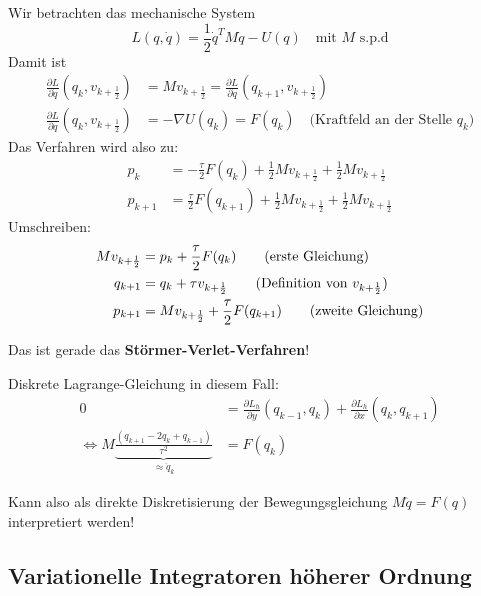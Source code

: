 Wir betrachten das mechanische System
\begin{equation*}
	L (q, \dot{q}) = \frac{1}{2} \dot{q}^T M \dot{q} - U(q) \quad\text{mit $M$ s.p.d}
\end{equation*}
Damit ist
\begin{align*}
	\frac{\partial L}{\partial \dot{q}}(q_k, v_{k + \frac{1}{2}}) & = Mv_{k + \frac{1}{2}} = \frac{\partial L}{\partial \dot{q}} (q_{k+1}, v_{k + \frac{1}{2}}) \\
	\frac{\partial L}{\partial q}(q_k, v_{k + \frac{1}{2}}) & = - \nabla U(q_k) = F(q_k) \quad\text{(Kraftfeld an der Stelle $q_k$)}
\end{align*}
Das Verfahren wird also zu:
\begin{align*}
	p_k & = - \frac{\tau}{2} F(q_k) + \frac{1}{2} Mv_{k+\frac{1}{2}}  + \frac{1}{2} Mv_{k+\frac{1}{2}} \\
	p_{k + 1} & =  \frac{\tau}{2} F(q_{k+1}) + \frac{1}{2} Mv_{k+\frac{1}{2}}  + \frac{1}{2} Mv_{k+\frac{1}{2}}
\end{align*}
Umschreiben:
\begin{align*}
	Mv_{k+\frac{1}{2}} & = p_k + \frac{\tau}{2} F(q_k) \tag{erste Gleichung}\\
	q_{k + 1} & = q_k + \tau v_{k+\frac{1}{2}} \tag{Definition von $v_{k+ \frac{1}{2}}$}\\
	p_{k + 1} & = Mv_{k+\frac{1}{2}}  + \frac{\tau}{2} F(q_{k+1}) \tag{zweite Gleichung}\\
\end{align*}

Das ist gerade das \textbf{Störmer-Verlet-Verfahren}!

Diskrete Lagrange-Gleichung in diesem Fall:
\begin{align*}
	0 & =  \frac{\partial L_h}{\partial y} (q_{k-1}, q_k) + \frac{\partial L_h}{\partial x} (q_k, q_{k+1}) \\
	\Leftrightarrow M\underbrace{\frac{(q_{k+1} - 2q_k + q_{k-1})}{\tau^2}}_{\approx \ddot{q}_k} & = F(q_k)
\end{align*}

Kann also als direkte Diskretisierung der Bewegungsgleichung $M \ddot{q} = F(q)$ interpretiert werden!








\subsection{Variationelle Integratoren höherer Ordnung}

